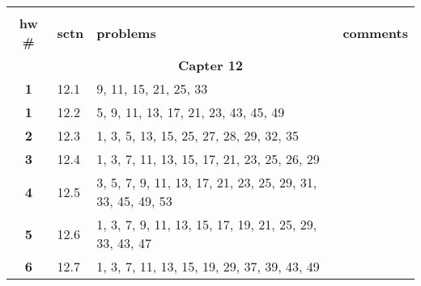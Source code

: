 \documentclass[10pt]{article}
\begin{document}
\small
\begin{centering}
\begin{tabular}{||c|l|p{3.25in}|p{2.00in}||} \hline \hline
              &          &                     &               \\
\bf hw \#        & \bf sctn & \centerline{\bf problems} & \centerline{\bf comments}
                              \\ \hline
\multicolumn{4}{||c||}{\textbf{Capter 12}}
\\ \hline

\bf  1 & 12.1  & 9, 11, 15,  21, 25, 33  &
               
\\ \hline
\bf  1 & 12.2  & 5, 9, 11, 13, 17, 21, 23, 43, 45, 49   &
               
\\ \hline
\bf  2 & 12.3  & 1, 3, 5, 13, 15, 25, 27, 28, 29, 32, 35  &
               
\\ \hline
\bf  3 & 12.4  & 1, 3, 7, 11, 13, 15, 17, 21, 23, 25, 26, 29  &
               
\\ \hline
\bf  4 & 12.5  & 3, 5, 7, 9, 11, 13, 17, 21, 23, 25, 29, 31, 33, 45, 49, 53  & 
                
\\ \hline
\bf  5 & 12.6  & 1, 3, 7,  9, 11, 13, 15, 17, 19, 21, 25, 29, 33, 43, 47 &
                
\\ \hline
\bf  6 & 12.7  & 1, 3, 7, 11, 13, 15, 19, 29, 37, 39, 43, 49  &
               
\\ \hline
\end{tabular}
\\
\end{centering}

\end{document}
